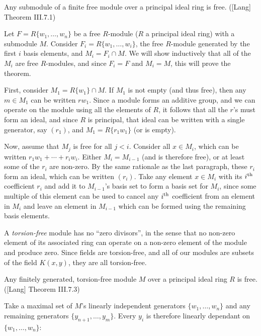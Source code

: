 Any submodule of a finite free module over a principal ideal ring is free.
([Lang] Theorem III.7.1)

\proof

Let $F = R\{w_1,\ldots,w_n\}$ be a free $R$-module ($R$ a principal
ideal ring) with a submodule $M$.  Consider $F_i =
R\{w_1,\ldots,w_i\}$, the free $R$-module generated by the first $i$
basis elements, and $M_i = F_i \cap M$.  We will show inductively that
all of the $M_i$ are free $R$-modules, and since $F_i = F$ and $M_i =
M$, this will prove the theorem.

First, consider $M_1 = R\{w_1\} \cap M$.  If $M_1$ is not empty (and
thus free), then any $m \in M_1$ can be written $r w_1$.  Since a
module forms an additive group, and we can operate on the module using
all the elements of $R$, it follows that all the $r$'s must form an
ideal, and since $R$ is principal, that ideal can be written with a
single generator, say $(r_1)$, and $M_1 = R\{r_1 w_1\}$ (or is empty).

Now, assume that $M_j$ is free for all $j<i$.  Consider all $x \in
M_i$, which can be written $r_1 w_1 + \cdots + r_i w_i$.  Either $M_i
= M_{i-1}$ (and is therefore free), or at least some of the $r_i$ are
non-zero.  By the same rationale as the last paragraph, these $r_i$
form an ideal, which can be written $(r_i)$.  Take any element $x \in
M_i$ with its $i^{\rm th}$ coefficient $r_i$ and add it to
$M_{i-1}$'s basis set to form a basis set for $M_i$, since some
multiple of this element can be used to cancel any $i^{\rm th}$
coefficient from an element in $M_i$ and leave an element in $M_{i-1}$
which can be formed using the remaining basis elements.

\endtheorem

A {\it torsion-free} module has no ``zero divisors'', in the sense
that no non-zero element of its associated ring can operate on a
non-zero element of the module and produce zero.  Since fields are
torsion-free, and all of our modules are subsets of the field
$K(x,y)$, they are all torsion-free.

\theorem
\label{finitely generated torsion-free modules over a PIR are free}

Any finitely generated, torsion-free module $M$ over a principal ideal
ring $R$ is free. ([Lang] Theorem III.7.3)

\proof

Take a maximal set of $M$'s linearly independent generators $\{w_1,
\ldots, w_n\}$ and any remaining generators $\{y_{n+1}, \ldots,
y_m\}$.  Every $y_i$ is therefore linearly dependant on $\{w_1,
\ldots, w_n\}$:

